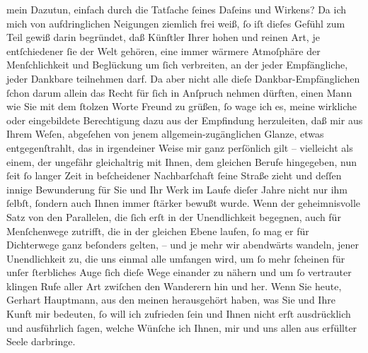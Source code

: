 \begin{ledgroupsized}[t]{13cm}
               mein Dazutun, einfach durch die Tatſache ſeines Daſeins und Wirkens? Da ich mich von
               aufdringlichen Neigungen ziemlich frei weiß, ſo iſt dieſes Gefühl zum Teil gewiß
               darin begründet, daß Künſtler Ihrer hohen und reinen Art, je entſchiedener ſie der
               Welt gehören, eine immer wärmere Atmoſphäre der Menſchlichkeit und Beglückung um ſich
               verbreiten, an der jeder Empfängliche, jeder Dankbare teilnehmen darf. Da aber nicht
               alle dieſe Dankbar-Empfänglichen ſchon darum allein das Recht für ſich in Anſpruch
               nehmen dürften, einen Mann wie Sie mit dem ſtolzen Worte Freund zu grüßen, ſo wage
               ich es, meine wirkliche oder eingebildete Berechtigung dazu aus der Empfindung
               herzuleiten, daß mir aus Ihrem Weſen, abgeſehen von jenem allgemein-zugänglichen
               Glanze, etwas entgegenſtrahlt, das in irgendeiner Weise mir ganz perſönlich gilt –
               vielleicht als einem, der ungefähr gleichaltrig mit Ihnen, dem gleichen Berufe
               hingegeben, nun ſeit ſo langer Zeit in beſcheidener Nachbarſchaft ſeine Straße zieht
               und deſſen innige Bewunderung für Sie und Ihr Werk im Laufe dieſer Jahre nicht nur
               ihm ſelbſt, ſondern auch Ihnen immer ſtärker bewußt wurde. Wenn der geheimnisvolle
               Satz von den Parallelen, die ſich erſt in der Unendlichkeit begegnen, auch für
               Menſchenwege zutrifft, die in der gleichen Ebene laufen, ſo mag er für Dichterwege
               ganz beſonders gelten, – und je mehr wir abendwärts wandeln, jener Unendlichkeit zu,
               die uns einmal alle umfangen wird, um ſo mehr ſcheinen für unſer ſterbliches Auge
               ſich dieſe Wege einander zu nähern und um ſo vertrauter klingen Rufe aller Art
               zwiſchen den Wanderern hin und her. Wenn Sie heute, Gerhart Hauptmann, aus den meinen
               herausgehört haben, was Sie und Ihre Kunft mir bedeuten, ſo will ich zufrieden ſein
               und Ihnen nicht erſt ausdrücklich und ausführlich ſagen, welche Wünſche ich Ihnen,
               mir und uns allen aus erfüllter Seele darbringe.\pend
           
         
         \endnumbering{}\end{ledgroupsized}  \newcommand{\dateiname}{L02377}\newcommand{\titel}{Arthur Schnitzler an Gerhart Hauptmann, 17. 3. 1922}\newcommand{\editorInnen}{ Martin Anton Müller und Gerd-Hermann Susen}
      
